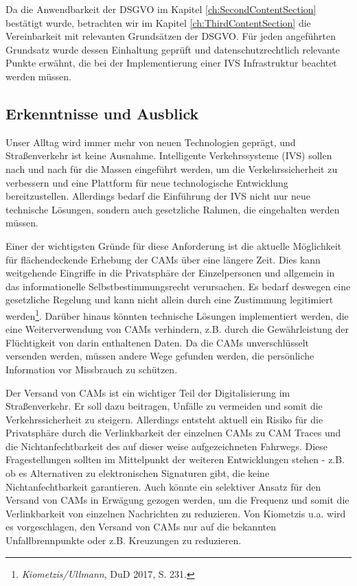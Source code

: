 Da die Anwendbarkeit der DSGVO im Kapitel \ref{ch:SecondContentSection} bestätigt wurde, betrachten wir im Kapitel \ref{ch:ThirdContentSection} die Vereinbarkeit mit relevanten Grundsätzen der DSGVO. Für jeden angeführten Grundsatz wurde dessen Einhaltung geprüft und datenschutzrechtlich relevante Punkte erwähnt, die bei der Implementierung einer IVS Infrastruktur beachtet werden müssen.


\subsection{Erkenntnisse und Ausblick}

Unser Alltag wird immer mehr von neuen Technologien geprägt, und Straßenverkehr ist keine Ausnahme. Intelligente Verkehrssysteme (IVS) sollen nach und nach für die Massen eingeführt werden, um die Verkehrssicherheit zu verbessern und eine Plattform für neue technologische Entwicklung bereitzustellen. Allerdings bedarf die Einführung der IVS nicht nur neue technische Lösungen, sondern auch gesetzliche Rahmen, die eingehalten werden müssen. 

Einer der wichtigsten Gründe für diese Anforderung ist die aktuelle Möglichkeit für flächendeckende Erhebung der CAMs über eine längere Zeit. Dies kann weitgehende Eingriffe in die Privatsphäre der Einzelpersonen und allgemein in das informationelle Selbstbestimmungsrecht verursachen. Es bedarf deswegen eine gesetzliche Regelung und kann nicht allein durch eine Zustimmung legitimiert werden\footnote{\emph{Kiometzis/Ullmann}, DuD 2017, S. 231.}. Darüber hinaus könnten technische Lösungen implementiert werden, die eine Weiterverwendung von CAMs verhindern, z.B. durch die Gewährleistung der Flüchtigkeit von darin enthaltenen Daten. Da die CAMs unverschlüsselt versenden werden, müssen andere Wege gefunden werden, die persönliche Information vor Missbrauch zu schützen.

Der Versand von CAMs ist ein wichtiger Teil der Digitalisierung im Straßenverkehr. Er soll dazu beitragen, Unfälle zu vermeiden und somit die Verkehrssicherheit zu steigern. Allerdings entsteht aktuell ein Risiko für die Privatsphäre durch die Verlinkbarkeit der einzelnen CAMs zu CAM Traces und die Nichtanfechtbarkeit des auf dieser weise aufgezeichneten Fahrwegs. Diese Fragestellungen sollten im Mittelpunkt der weiteren Entwicklungen stehen - z.B. ob es Alternativen zu elektronischen Signaturen gibt, die keine Nichtanfechtbarkeit garantieren. Auch könnte ein selektiver Ansatz für den Versand von CAMs in Erwägung gezogen werden, um die Frequenz und somit die Verlinkbarkeit von einzelnen Nachrichten zu reduzieren. Von Kiometzis u.a. wird es vorgeschlagen, den Versand von CAMs nur auf die bekannten Unfallbrennpunkte oder z.B. Kreuzungen zu reduzieren.

